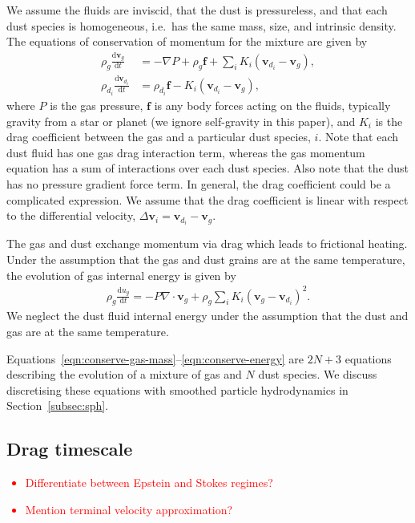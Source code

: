 \documentclass[fleqn,usenatbib]{mnras}
\newcommand{\dd}{\mathrm{d}}
\let\vec\mathbf
\begin{document}
We assume the fluids are inviscid, that the dust is pressureless, and that each
dust species is homogeneous, i.e.\ has the same mass, size, and intrinsic
density. The equations of conservation of momentum for the mixture are given by
%
\begin{align}
   \rho_g \frac{\dd \vec{v}_g}{\dd t}
      &= - \nabla P + \rho_g \vec{f} + \sum_i K_i \left(\vec{v}_{d_i}
         - \vec{v}_{g}\right), \\
   \rho_{d_i} \frac{\dd \vec{v}_{d_i}}{\dd t}
      &= \rho_{d_i} \vec{f} - K_i \left(\vec{v}_{d_i} - \vec{v}_{g}\right),
\end{align}
%
where \(P\) is the gas pressure, \(\vec{f}\) is any body forces acting on the
fluids, typically gravity from a star or planet (we ignore self-gravity in this
paper), and \(K_i\) is the drag coefficient between the gas and a particular
dust species, \(i\). Note that each dust fluid has one gas drag interaction
term, whereas the gas momentum equation has a sum of interactions over each dust
species. Also note that the dust has no pressure gradient force term. In
general, the drag coefficient could be a complicated expression. We assume that
the drag coefficient is linear with respect to the differential velocity,
\(\Delta \vec{v}_i = \vec{v}_{d_i} - \vec{v}_g \).

The gas and dust exchange momentum via drag which leads to frictional heating.
Under the assumption that the gas and dust grains are at the same temperature,
the evolution of gas internal energy is given by
%
\begin{align}
   \label{eqn:conserve-energy}
   \rho_g \frac{\dd u_g}{\dd t} =
      - P \nabla \cdot \vec{v}_g + \rho_g \sum_i K_i {(\vec{v}_g - \vec{v}_{d_i})}^2.
\end{align}
%
We neglect the dust fluid internal energy under the assumption that the dust and
gas are at the same temperature.

Equations~\ref{eqn:conserve-gas-mass}--\ref{eqn:conserve-energy} are \(2N + 3\)
equations describing the evolution of a mixture of gas and \(N\) dust species.
We discuss discretising these equations with smoothed particle hydrodynamics in
Section~\ref{subsec:sph}.

\subsection{Drag timescale}

\textcolor{red}{
\begin{itemize}
   \item Differentiate between Epstein and Stokes regimes?
   \item Mention terminal velocity approximation?
\end{itemize}
}
\end{document}
